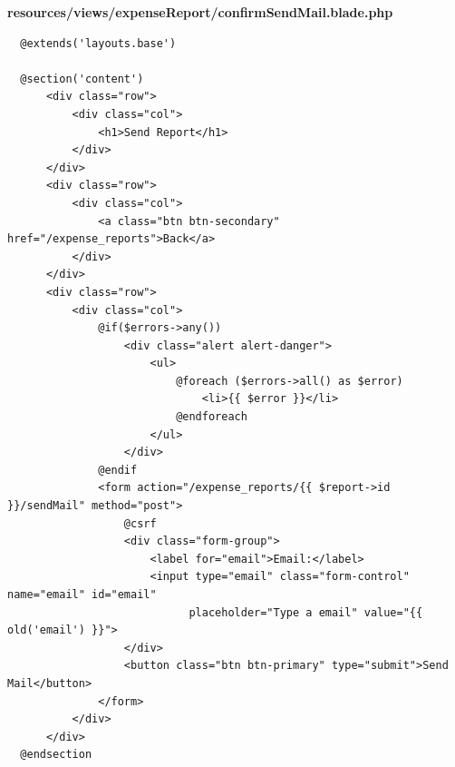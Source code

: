 \documentclass{article}
\begin{document}
\textbf{resources/views/expenseReport/confirmSendMail.blade.php}
\begin{verbatim}
  @extends('layouts.base')

  @section('content')
      <div class="row">
          <div class="col">
              <h1>Send Report</h1>
          </div>
      </div>
      <div class="row">
          <div class="col">
              <a class="btn btn-secondary" href="/expense_reports">Back</a>
          </div>
      </div>
      <div class="row">
          <div class="col">
              @if($errors->any())
                  <div class="alert alert-danger">
                      <ul>
                          @foreach ($errors->all() as $error)
                              <li>{{ $error }}</li>
                          @endforeach
                      </ul>
                  </div>
              @endif
              <form action="/expense_reports/{{ $report->id }}/sendMail" method="post">
                  @csrf
                  <div class="form-group">
                      <label for="email">Email:</label>
                      <input type="email" class="form-control" name="email" id="email"
                            placeholder="Type a email" value="{{ old('email') }}">
                  </div>
                  <button class="btn btn-primary" type="submit">Send Mail</button>
              </form>
          </div>
      </div>
  @endsection
\end{verbatim}
\end{document}
